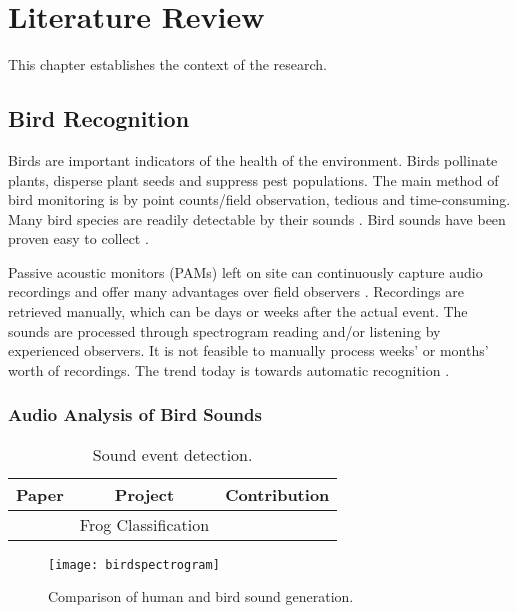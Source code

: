 

\chapter{Literature Review}

This chapter establishes the context of the research.

\section{Bird Recognition}

Birds are important indicators of the health of the environment. 
Birds  pollinate plants, disperse plant seeds and suppress pest populations. \citep{Farina2013}
The main method of bird monitoring is by point counts/field observation, tedious and time-consuming.
Many bird species are readily detectable by their sounds \citep{Kuaga2019}.
Bird sounds have been proven easy to collect \citep{Mcloughlin2019}.


Passive acoustic monitors (PAMs) left on site can continuously capture audio recordings and offer many advantages over field observers \citep{Digby2013,Sugai2019}.
 Recordings are retrieved manually, which can be days or weeks after the actual event.
The sounds are processed through spectrogram reading and/or listening by experienced observers.
It is not feasible to manually process weeks' or months’ worth of recordings. The trend today is towards automatic recognition \citep{Aide2013}.


\subsection{Audio Analysis of Bird Sounds}


\begin{table}
\centering
\caption{Sound event detection.}
\begin{tabular}{ccl}
\toprule
\textbf{Paper} & \textbf{Project} & \textbf{Contribution} \\
\midrule
\cite{Xie2018} & Frog Classification \\
\bottomrule
\end{tabular}
\end{table}

\begin{figure}
\centering
\texttt{[image: birdspectrogram]}
\caption{Comparison of human and bird sound generation.}
\end{figure}

